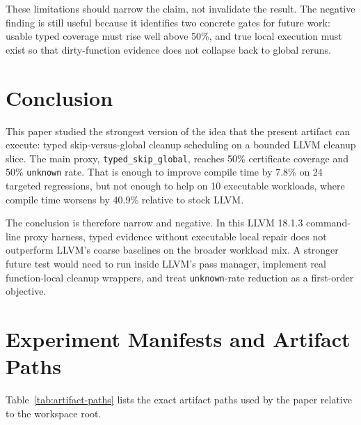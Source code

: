 \documentclass{article}
\begin{document}
These limitations should narrow the claim, not invalidate the result. The negative finding is still useful because it identifies two concrete gates for future work: usable typed coverage must rise well above 50\%, and true local execution must exist so that dirty-function evidence does not collapse back to global reruns.

\section{Conclusion}
\label{sec:conclusion}

This paper studied the strongest version of the idea that the present artifact can execute: typed skip-versus-global cleanup scheduling on a bounded LLVM cleanup slice. The main proxy, \texttt{typed\_skip\_global}, reaches 50\% certificate coverage and 50\% \texttt{unknown} rate. That is enough to improve compile time by 7.8\% on 24 targeted regressions, but not enough to help on 10 executable workloads, where compile time worsens by 40.9\% relative to stock LLVM.

The conclusion is therefore narrow and negative. In this LLVM 18.1.3 command-line proxy harness, typed evidence without executable local repair does not outperform LLVM's coarse baselines on the broader workload mix. A stronger future test would need to run inside LLVM's pass manager, implement real function-local cleanup wrappers, and treat \texttt{unknown}-rate reduction as a first-order objective.




\appendix

\section{Experiment Manifests and Artifact Paths}
\label{app:artifacts}

Table~\ref{tab:artifact-paths} lists the exact artifact paths used by the paper relative to the workspace root.
\end{document}
